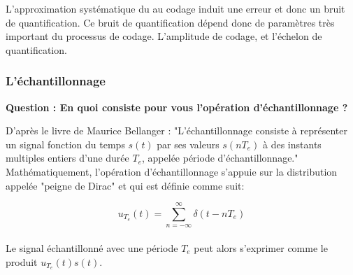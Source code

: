 \documentclass[11pt,a4paper]{article}
\begin{document}
L'approximation systématique du au codage induit une erreur et donc un bruit de quantification. Ce bruit de quantification dépend donc de paramètres très important du processus de codage. L'amplitude de codage, et l'échelon de quantification.\\

\subsubsection{L'échantillonnage}

\textbf{Question : En quoi consiste pour vous l'opération d'échantillonnage ?}

D'après le livre de Maurice Bellanger : "L’échantillonnage consiste à représenter un signal fonction du temps $s(t)$ par ses
valeurs $s(nT_e)$ à des instants multiples entiers d’une durée $T_e$, appelée période d’échantillonnage."\\

Mathématiquement, l'opération d'échantillonnage s'appuie sur la distribution appelée "peigne de Dirac" et qui est définie comme suit: 

\[ u_{T_e}(t) = \sum_{n = -\infty}^{\infty} \delta(t-nT_e) \]\\

Le signal échantillonné avec une période $T_e$ peut alors s'exprimer comme le produit $u_{T_e}(t) s(t)$.\\

\begin{center}
\end{center}

\begin{center}
\end{center}
\end{document}
